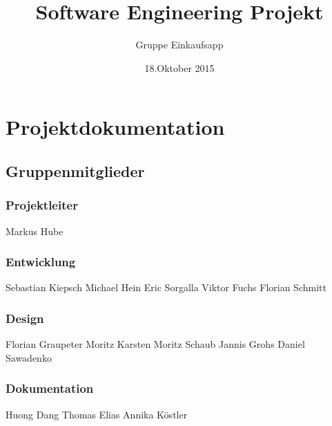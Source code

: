 \documentclass[12pt,a4paper]{article}
\begin{document}
\title{Software Engineering Projekt}
\author{Gruppe Einkaufsapp}
\date {18.Oktober 2015}
\maketitle
\newpage
\tableofcontents
\newpage
\section*{Projektdokumentation}
\subsection*{Gruppenmitglieder}
\subsubsection*{Projektleiter}
Markus Hube
\subsubsection*{Entwicklung}
Sebastian Kiepsch
\newline
Michael Hein
\newline
Eric Sorgalla
\newline
Viktor Fuchs
\newline
Florian Schmitt 
\subsubsection*{Design}
Florian Graupeter
\newline
Moritz Karsten
\newline
Moritz Schaub
\newline
Jannis Grohs
\newline
Daniel Sawadenko 
\subsubsection*{Dokumentation}
Huong Dang
\newline
Thomas Elias
\newline
Annika Köstler

\newpage

\end{document}
